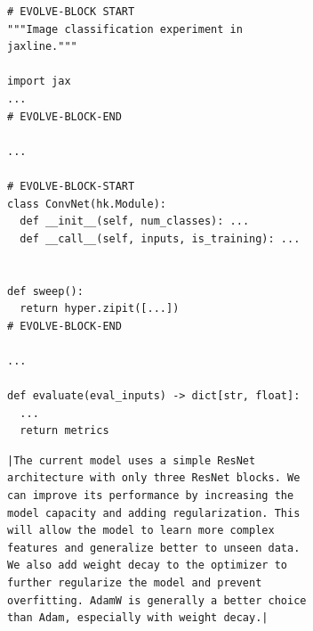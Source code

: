 \begin{figure}[htbp]
    \centering
    \begin{minipage}[c]{0.48\textwidth} %
        \centering
        \begin{subfigure}[t]{\textwidth} %
            \centering
\begin{verbatim}
# EVOLVE-BLOCK START
"""Image classification experiment in jaxline."""

import jax
...
# EVOLVE-BLOCK-END

...

# EVOLVE-BLOCK-START
class ConvNet(hk.Module):
  def __init__(self, num_classes): ...
  def __call__(self, inputs, is_training): ...


def sweep():
  return hyper.zipit([...])
# EVOLVE-BLOCK-END

...

def evaluate(eval_inputs) -> dict[str, float]:
  ...
  return metrics
\end{verbatim}
            \captionsetup{justification=centering, singlelinecheck=false}
            \caption{}
            \label{fig:grounding-api}
        \end{subfigure}
        \vfill %
        \begin{subfigure}[b]{\textwidth} %
            \centering

\begin{verbatim}
|The current model uses a simple ResNet architecture with only three ResNet blocks. We can improve its performance by increasing the model capacity and adding regularization. This will allow the model to learn more complex features and generalize better to unseen data. We also add weight decay to the optimizer to further regularize the model and prevent overfitting. AdamW is generally a better choice than Adam, especially with weight decay.|



\end{verbatim}
\end{subfigure}
\end{minipage}
\end{figure}
